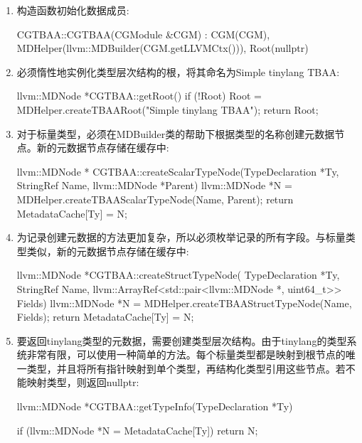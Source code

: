 \begin{enumerate}
\item
构造函数初始化数据成员:

\begin{cpp}
CGTBAA::CGTBAA(CGModule &CGM)
    : CGM(CGM),
    MDHelper(llvm::MDBuilder(CGM.getLLVMCtx())),
    Root(nullptr) {}
\end{cpp}

\item
必须惰性地实例化类型层次结构的根，将其命名为Simple tinylang TBAA:

\begin{cpp}
llvm::MDNode *CGTBAA::getRoot() {
    if (!Root)
        Root = MDHelper.createTBAARoot("Simple tinylang TBAA");
    return Root;
}
\end{cpp}

\item
对于标量类型，必须在MDBuilder类的帮助下根据类型的名称创建元数据节点。新的元数据节点存储在缓存中:

\begin{cpp}
llvm::MDNode *
CGTBAA::createScalarTypeNode(TypeDeclaration *Ty,
                            StringRef Name,
                            llvm::MDNode *Parent) {
    llvm::MDNode *N =
        MDHelper.createTBAAScalarTypeNode(Name, Parent);
    return MetadataCache[Ty] = N;
}
\end{cpp}

\item
为记录创建元数据的方法更加复杂，所以必须枚举记录的所有字段。与标量类型类似，新的元数据节点存储在缓存中:

\begin{cpp}
llvm::MDNode *CGTBAA::createStructTypeNode(
        TypeDeclaration *Ty, StringRef Name,
        llvm::ArrayRef<std::pair<llvm::MDNode *, uint64_t>> Fields) {
    llvm::MDNode *N =
        MDHelper.createTBAAStructTypeNode(Name, Fields);
    return MetadataCache[Ty] = N;
}
\end{cpp}

\item
要返回tinylang类型的元数据，需要创建类型层次结构。由于tinylang的类型系统非常有限，可以使用一种简单的方法。每个标量类型都是映射到根节点的唯一类型，并且将所有指针映射到单个类型，再结构化类型引用这些节点。若不能映射类型，则返回nullptr:

\begin{cpp}
llvm::MDNode *CGTBAA::getTypeInfo(TypeDeclaration *Ty) {
    if (llvm::MDNode *N = MetadataCache[Ty])
        return N;

}
\end{cpp}
\end{enumerate}
